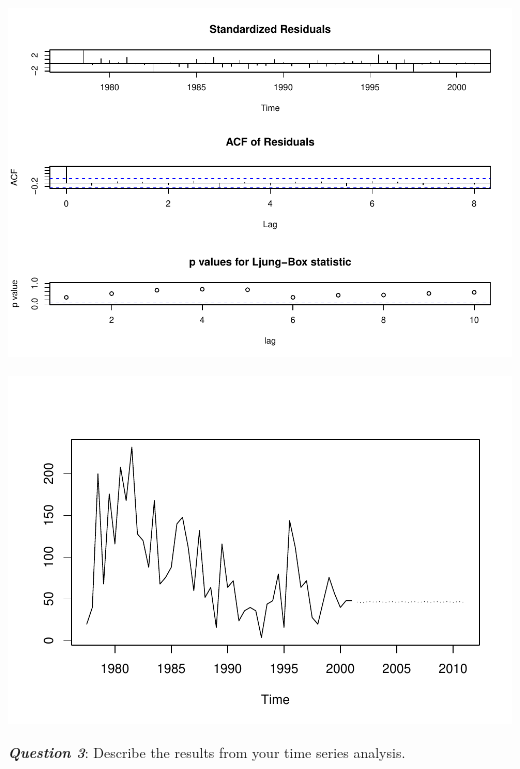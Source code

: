 \documentclass[]{article}
\newenvironment{Shaded}{\begin{snugshade}}{\end{snugshade}}
\newcommand{\KeywordTok}[1]{\textcolor[rgb]{0.13,0.29,0.53}{\textbf{{#1}}}}
\newcommand{\DataTypeTok}[1]{\textcolor[rgb]{0.13,0.29,0.53}{{#1}}}
\newcommand{\DecValTok}[1]{\textcolor[rgb]{0.00,0.00,0.81}{{#1}}}
\newcommand{\StringTok}[1]{\textcolor[rgb]{0.31,0.60,0.02}{{#1}}}
\newcommand{\NormalTok}[1]{{#1}}
\begin{document}
\includegraphics{temporal_assignment_files/figure-latex/unnamed-chunk-4-7.pdf}

\begin{Shaded}
\end{Shaded}

\includegraphics{temporal_assignment_files/figure-latex/unnamed-chunk-4-8.pdf}

\textbf{\emph{Question 3}}: Describe the results from your time series
analysis.
\end{document}
